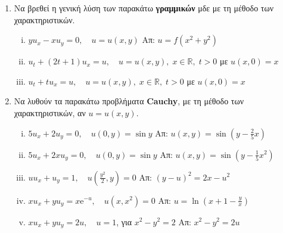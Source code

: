 \documentclass[a4paper,table]{report}
\begin{document}
\begin{center}
  \minibox{\large\bfseries \textcolor{Col1}{ΜΔΕ 1ης τάξης}}
\end{center}

\vspace{\baselineskip}

\begin{enumerate}

  \item Να βρεθεί η γενική λύση των παρακάτω \textbf{γραμμικών} μδε με τη μέθοδο των
    χαρακτηριστικών.

    \begin{enumerate}[i)]
      \item $yu_{x}-xu_{y}=0, \quad u=u(x,y)$ \hfill Απ: $u=f(x^{2}+y^{2})$ 
      \item $ u_{t}+(2t+1)u_{x}=u , \quad u=u(x,y), \; x \in \mathbb{R}, \; t>0$ 
        με $ u(x,0)=x $
      \item $ u_{t}+tu_{x}=u , \quad u=u(x,y), \; x \in \mathbb{R}, \; t>0$ 
        με $ u(x,0)=x $
    \end{enumerate}

    \item Να λυθούν τα παρακάτω προβλήματα \textlatin{\textbf{Cauchy}}, με τη μέθοδο των
        χαρακτηριστικών,  αν $u=u(x,y)$.

        \begin{enumerate}[i)]
          \item $5u_{x}+2u_{y}=0, \quad u(0,y)=\sin y$ 
            \hfill Απ: $u(x,y)=\sin(y-\frac{2}{5}x)$
          \item $5u_{x}+2xu_{y}=0, \quad u(0,y)=\sin y$ 
            \hfill Απ: $u(x,y)=\sin(y-\frac{1}{5}x^{2})$ 
          \item $uu_{x}+u_{y}=1, \quad u(\frac{y^{2}}{2},y)=0$ 
            \hfill Απ: $(y-u)^{2}=2x-u^{2}$
          \item $ xu_{x}+yu_{y}=x \mathrm{e}^{-u}, \quad  u(x,x^{2})=0 $
            \hfill Απ: $ u= \ln{(x+1 - \frac{y}{x})} $ 
          \item $xu_{x}+yu_{y}=2u,\quad u=1$, για $x^{2}-y^{2}=2$ 
            \hfill Απ: $x^{2}-y^{2}=2u$
        \end{enumerate}
    \end{enumerate}
\end{document}
